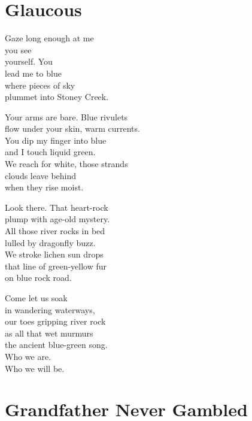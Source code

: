 \documentclass[twoside,10pt]{book}
\begin{document}
\clearpage
\section{Glaucous}

Gaze long enough at me\\
you see\\
yourself. You\\
lead me to blue\\
where pieces of sky\\
plummet into Stoney Creek.

Your arms are bare. Blue rivulets\\
flow under your skin, warm currents.\\
You dip my finger into blue\\
and I touch liquid green.\\
We reach for white, those strands\\
clouds leave behind\\
when they rise moist.

Look there. That heart-rock\\
plump with age-old mystery.\\
All those river rocks in bed\\
lulled by dragonfly buzz.\\
We stroke lichen sun drops\\
that line of green-yellow fur\\
on blue rock road.

Come let us soak\\
in wandering waterways,\\
our toes gripping river rock\\
as all that wet murmurs\\
the ancient blue-green song.\\
Who we are.\\
Who we will be.


\clearpage
\section{Grandfather Never Gambled}
\end{document}
